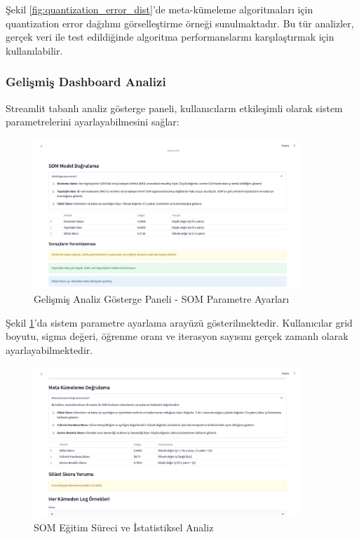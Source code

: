 Şekil \ref{fig:quantization_error_dist}'de meta-kümeleme algoritmaları için quantization error dağılımı görselleştirme örneği sunulmaktadır. Bu tür analizler, gerçek veri ile test edildiğinde algoritma performanslarını karşılaştırmak için kullanılabilir.

\newpage

\subsubsection{Gelişmiş Dashboard Analizi}

Streamlit tabanlı analiz gösterge paneli, kullanıcıların etkileşimli olarak sistem parametrelerini ayarlayabilmesini sağlar:

\begin{figure}[!ht]
    \centering
    \includegraphics[width=0.9\textwidth]{images/som-parametre-ayarlari-dashboard.png}
    \caption{Gelişmiş Analiz Gösterge Paneli - SOM Parametre Ayarları}
    \label{fig:advanced_dashboard}
\end{figure}

Şekil \ref{fig:advanced_dashboard}'da sistem parametre ayarlama arayüzü gösterilmektedir. Kullanıcılar grid boyutu, sigma değeri, öğrenme oranı ve iterasyon sayısını gerçek zamanlı olarak ayarlayabilmektedir.

\begin{figure}[!ht]
    \centering
    \includegraphics[width=0.9\textwidth]{images/som-egitim-sureci-analizi.png}
    \caption{SOM Eğitim Süreci ve İstatistiksel Analiz}
    \label{fig:som_training_stats}
\end{figure}

